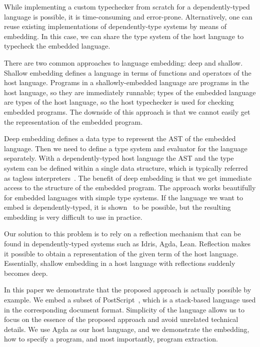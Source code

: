 \documentclass[sigplan,anonymous,review]{acmart}
\begin{document}
While implementing a custom typechecker from scratch for a
dependently-typed language is possible, it is time-consuming and error-prone.
Alternatively, one can reuse existing implementations of dependently-type
systems by means of embedding.  In this case, we can share the type system
of the host language to typecheck the embedded language.

There are two common approaches to language embedding: deep and shallow.
Shallow embedding defines a language in terms of functions and operators
of the host language.  Programs in a shallowly-embedded language are programs
in the host language, so they are immediately runnable; types of the embedded
language are types of the host language, so the host typechecker is used for
checking embedded programs.  The downside of this approach is that we cannot
easily get the representation of the embedded program.

Deep embedding defines a data type to represent the AST of the embedded language.
Then we need to define a type system and evaluator for the language separately.
With a dependently-typed host language the AST and the type system can be
defined within a single data structure, which is typically referred as
tagless interpreters~\cite{}.  The benefit of deep embedding is that we
get immediate access to the structure of the embedded program.
The approach works beautifully for
embedded languages with simple type systems.  If the language we want to
embed is dependently-typed, it is shown~\cite{} to be possible, but the
resulting embedding is very difficult to use in practice.

Our solution to this problem is to rely on a reflection mechanism that
can be found in dependently-typed systems such as Idris, Agda, Lean.
Reflection makes it possible to obtain a representation of the
given term of the host language.  Essentially, shallow embedding in
a host language with reflections suddenly becomes deep.

In this paper we demonstrate that the proposed approach is actually possible
by example.  We embed a subset of PostScript~\cite{}, which is a stack-based
language used in the corresponding document format.  Simplicity of the language
allows us to focus on the essence of the proposed approach and avoid unrelated
technical details.  We use Agda as our host language, and we demonstrate the
embedding, how to specify a program, and most importantly, program extraction.

\end{document}
